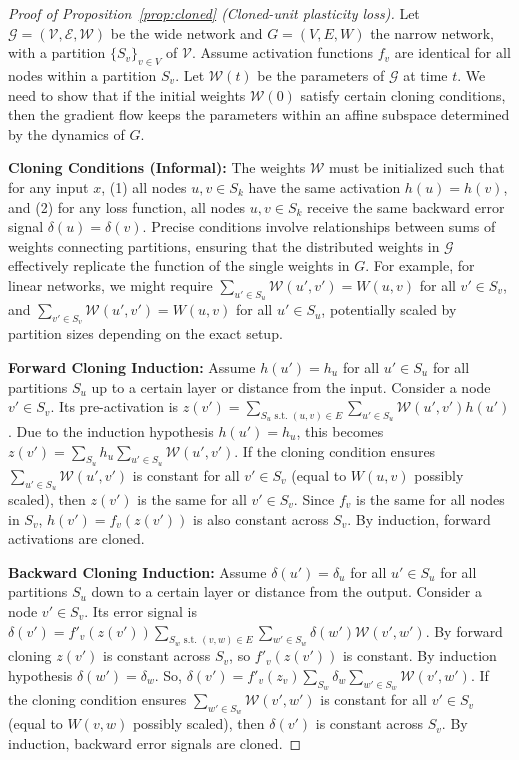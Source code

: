 \documentclass{article}
\begin{document}
\begin{proof}[Proof of Proposition~\ref{prop:cloned} (Cloned-unit plasticity loss)]
    Let $\mathcal{G}=(\mathcal{V},\mathcal{E},\mathcal{W})$ be the wide network and $G=(V,E,W)$ the narrow network, with a partition $\{S_v\}_{v\in V}$ of $\mathcal{V}$. Assume activation functions $f_v$ are identical for all nodes within a partition $S_v$. Let $\mathcal{W}(t)$ be the parameters of $\mathcal{G}$ at time $t$. We need to show that if the initial weights $\mathcal{W}(0)$ satisfy certain cloning conditions, then the gradient flow keeps the parameters within an affine subspace determined by the dynamics of $G$.

    \textbf{Cloning Conditions (Informal):} The weights $\mathcal{W}$ must be initialized such that for any input $x$, (1) all nodes $u, v \in S_k$ have the same activation $h(u)=h(v)$, and (2) for any loss function, all nodes $u, v \in S_k$ receive the same backward error signal $\delta(u)=\delta(v)$. Precise conditions involve relationships between sums of weights connecting partitions, ensuring that the distributed weights in $\mathcal{G}$ effectively replicate the function of the single weights in $G$. For example, for linear networks, we might require $\sum_{u' \in S_u} \mathcal{W}(u', v') = W(u,v)$ for all $v' \in S_v$, and $\sum_{v' \in S_v} \mathcal{W}(u', v') = W(u,v)$ for all $u' \in S_u$, potentially scaled by partition sizes depending on the exact setup.

    \textbf{Forward Cloning Induction:} Assume $h(u') = h_u$ for all $u' \in S_u$ for all partitions $S_u$ up to a certain layer or distance from the input. Consider a node $v' \in S_v$. Its pre-activation is $z(v') = \sum_{S_u \text{ s.t. } (u,v)\in E} \sum_{u' \in S_u} \mathcal{W}(u', v') h(u')$. Due to the induction hypothesis $h(u')=h_u$, this becomes $z(v') = \sum_{S_u} h_u \sum_{u' \in S_u} \mathcal{W}(u', v')$. If the cloning condition ensures $\sum_{u' \in S_u} \mathcal{W}(u', v')$ is constant for all $v' \in S_v$ (equal to $W(u,v)$ possibly scaled), then $z(v')$ is the same for all $v' \in S_v$. Since $f_v$ is the same for all nodes in $S_v$, $h(v') = f_v(z(v'))$ is also constant across $S_v$. By induction, forward activations are cloned.

    \textbf{Backward Cloning Induction:} Assume $\delta(u') = \delta_u$ for all $u' \in S_u$ for all partitions $S_u$ down to a certain layer or distance from the output. Consider a node $v' \in S_v$. Its error signal is $\delta(v') = f'_v(z(v')) \sum_{S_w \text{ s.t. } (v,w)\in E} \sum_{w' \in S_w} \delta(w') \mathcal{W}(v', w')$. By forward cloning $z(v')$ is constant across $S_v$, so $f'_v(z(v'))$ is constant. By induction hypothesis $\delta(w')=\delta_w$. So, $\delta(v') = f'_v(z_v) \sum_{S_w} \delta_w \sum_{w' \in S_w} \mathcal{W}(v', w')$. If the cloning condition ensures $\sum_{w' \in S_w} \mathcal{W}(v', w')$ is constant for all $v' \in S_v$ (equal to $W(v,w)$ possibly scaled), then $\delta(v')$ is constant across $S_v$. By induction, backward error signals are cloned.


\end{proof}
\end{document}

